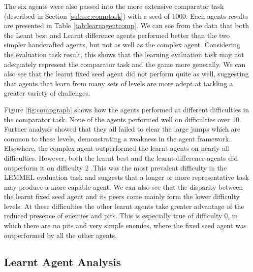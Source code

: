 The six agents were also passed into the more extensive comparator task (described in Section \ref{subsec:comptask}) with a seed of 1000. Each agents results are presented in Table \ref{tab:learnagentcomp}. We can see from the data that both the Leant best and Learnt difference agents performed better than the two simpler handcrafted agents, but not as well as the complex agent. Considering the evaluation task result, this shows that the learning evaluation task may not adequately represent the comparator task and the game more generally. We can also see that the learnt fixed seed agent did not perform quite as well, suggesting that agents that learn from many sets of levels are more adept at tackling a greater variety of challenges.

Figure \ref{fig:compgraph} shows how the agents performed at different difficulties in the comparator task. None of the agents performed well on difficulties over 10. Further analysis showed that they all failed to clear the large jumps which are common to these levels, demonstrating a weakness in the agent framework. Elsewhere, the complex agent outperformed the learnt agents on nearly all difficulties. However, both the learnt best and the learnt difference agents did outperform it on difficulty 2 .This was the most prevalent difficulty in the LEMMEL evaluation task and suggests that a longer or more representative task may produce a more capable agent. We can also see that the disparity between the learnt fixed seed agent and its peers come mainly form the lower difficulty levels. At these difficulties the other learnt agents take greater advantage of the reduced presence of enemies and pits. This is especially true of difficulty 0, in which there are no pits and very simple enemies, where the fixed seed agent was outperformed by all the other agents.



\subsection{Learnt Agent Analysis}
\label{subsec:evallearn2}


